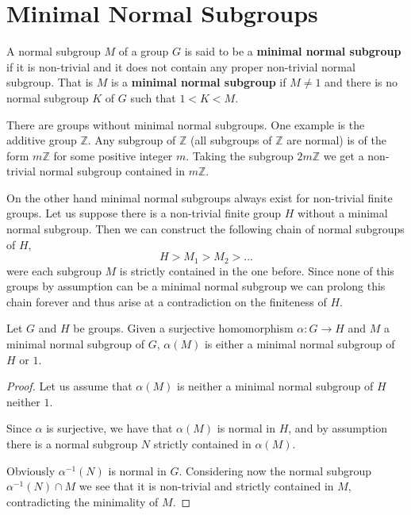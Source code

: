 \pagebreak

\section{Minimal Normal Subgroups}

\begin{definition}
A normal subgroup $M$ of a group $G$ is said to be a \textbf{minimal normal subgroup} if it is non-trivial and it does not contain any proper non-trivial normal subgroup. That is $M$ is a \textbf{minimal normal subgroup} if $M \ne 1$ and there is no normal subgroup $K$ of $G$ such that $1 < K < M$. 
\end{definition}

There are groups without minimal normal subgroups. One example is the additive group $\mathbb{Z}$. Any subgroup of $\mathbb{Z}$ (all subgroups of $\mathbb{Z}$ are normal) is of the form $m\mathbb{Z}$ for some positive integer $m$. Taking the subgroup $2m\mathbb{Z}$ we get a non-trivial normal subgroup contained in $m\mathbb{Z}$.

On the other hand minimal normal subgroups always exist for non-trivial finite groups. 
Let us suppose there is a non-trivial finite group $H$ without a minimal normal subgroup. Then we can construct the following chain of normal subgroups of $H$,
$$
H > M_1 > M_2 > ...
$$
were each subgroup $M$ is strictly contained in the one before. Since none of this groups by assumption can be a minimal normal subgroup we can prolong this chain forever and thus arise at a contradiction on the finiteness of $H$.

\begin{theorem}
    \label{hommnsub}
    Let $G$ and $H$ be groups.
    Given a surjective homomorphism $\alpha\colon G \rightarrow H$ and $M$ a minimal normal subgroup of $G$, $\alpha(M)$ is either a minimal normal subgroup of $H$ or $1$.
\end{theorem}
\begin{proof}
    Let us assume that $\alpha(M)$ is neither a minimal normal subgroup of $H$ neither $1$.

    Since $\alpha$ is surjective, we have that $\alpha(M)$ is normal in $H$, and by assumption there is a normal subgroup $N$ strictly contained in $\alpha(M)$.
    
    Obviously $\alpha^{-1}(N)$ is normal in $G$. Considering now the normal subgroup $\alpha^{-1}(N) \cap M$ we see that it is non-trivial and strictly contained in $M$, contradicting the minimality of $M$.
\end{proof}

